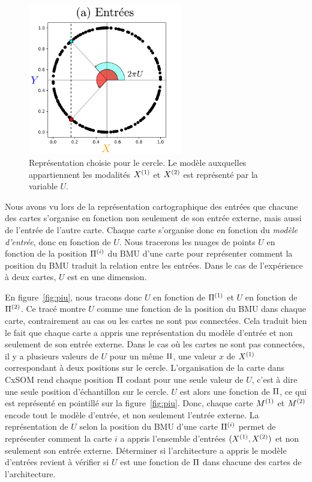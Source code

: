 \begin{figure}
\centering
\includegraphics[width=0.6\textwidth]{2som_inp.pdf}
\caption{Représentation choisie pour le cercle. Le modèle auxquelles appartiennent les modalités $X^{({1})}$ et $X^{({2})}$ est représenté par la variable $U$. \label{fig:U}}
\end{figure}

Nous avons vu lors de la représentation cartographique des entrées que chacune des cartes s'organise en fonction non seulement de son entrée externe, mais aussi de l'entrée de l'autre carte. Chaque carte s'organise donc en fonction du \emph{modèle d'entrée}, donc en fonction de $U$.
Nous tracerons les nuages de points $U$ en fonction de la position $\Pi^{({i})}$ du BMU d'une carte pour représenter comment la position du BMU traduit la relation entre les entrées. Dans le cas de l'expérience à deux cartes, $U$ est en une dimension.

En figure~\ref{fig:piu}, nous tracons donc $U$ en fonction de $\Pi^{({1})}$ et $U$ en fonction de $\Pi^{({2})}$.
Ce tracé montre $U$ comme une fonction de la position du BMU dans chaque carte, contrairement au cas ou les cartes ne sont pas connectées. Cela traduit bien le fait que chaque carte a appris une représentation du modèle d'entrée et non seulement de son entrée externe.
Dans le cas où les cartes ne sont pas connectées, il y a plusieurs valeurs de $U$ pour un même $\Pi$, une valeur $x$ de $X^{({1})}$ correspondant à deux positions sur le cercle.
L'organisation de la carte dans CxSOM rend chaque position $\Pi$ codant pour une seule valeur de $U$, c'est à dire une seule position d'échantillon sur le cercle. $U$ est alors une fonction de $\Pi$, ce qui est représenté en pointillé sur la figure~\ref{fig:piu}. Donc, chaque carte $M^{({1})}$ et $M^{({2})}$ encode tout le modèle d'entrée, et non seulement l'entrée externe.
La représentation de $U$ selon la position du BMU d'une carte $\Pi^{({i})}$ permet de représenter comment la carte $i$ a appris l'ensemble d'entrées $(X^{({1})},X^{({2})})$ et non seulement son entrée externe. Déterminer si l'architecture a appris le modèle d'entrées revient à vérifier si $U$ est une fonction de $\Pi$ dans chacune des cartes de l'architecture.
 
